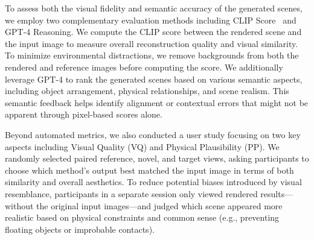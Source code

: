 To assess both the visual fidelity and semantic accuracy of the generated scenes, we employ two complementary evaluation methods including CLIP Score~\cite{taited2023CLIPScore} and GPT-4 Reasoning.
% 
We compute the CLIP score between the rendered scene and the input image to measure overall reconstruction quality and visual similarity. To minimize environmental distractions, we remove backgrounds from both the rendered and reference images before computing the score.
% 
We additionally leverage GPT-4 to rank the generated scenes based on various semantic aspects, including object arrangement, physical relationships, and scene realism. This semantic feedback helps identify alignment or contextual errors that might not be apparent through pixel-based scores alone.

Beyond automated metrics, we also conducted a user study focusing on two key aspects including Visual Quality (VQ) and Physical Plausibility (PP).
We randomly selected paired reference, novel, and target views, asking participants to choose which method’s output best matched the input image in terms of both similarity and overall aesthetics.
To reduce potential biases introduced by visual resemblance, participants in a separate session only viewed rendered results—without the original input images—and judged which scene appeared more realistic based on physical constraints and common sense (e.g., preventing floating objects or improbable contacts).


